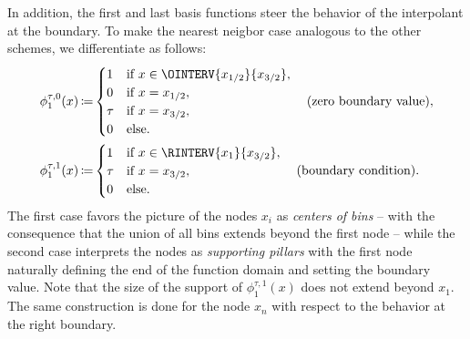 \documentclass[a4paper]{paper}
\DeclareMathOperator{\DEFEQ}{{\coloneqq}}
\begin{document}
In addition, the first and last basis functions steer the behavior of the interpolant at the boundary. To make the 
nearest neigbor case analogous to the other schemes, we differentiate as follows:
%
\begin{align*}
 \phi_1^{\tau, 0}(x) &\DEFEQ
  \begin{cases}
  1 & \text{if } x \in \OINTERV{x_{1/2}}{x_{3/2}}, \\
  0 & \text{if } x = x_{1/2}, \\
  \tau & \text{if } x = x_{3/2}, \\
  0 & \text{else}.
 \end{cases} \quad \text{(zero boundary value)}, \\
 \phi_1^{\tau, 1}(x) &\DEFEQ
  \begin{cases}
  1 & \text{if } x \in \RINTERV{x_1}{x_{3/2}}, \\
  \tau & \text{if } x = x_{3/2}, \\
  0 & \text{else}.
 \end{cases} \quad \text{(boundary condition)}. \\
\end{align*}
%
The first case favors the picture of the nodes $x_i$ as \emph{centers of bins} -- with the consequence that the union 
of all bins extends beyond the first node -- while the second case interprets the nodes as \emph{supporting pillars} 
with the first node naturally defining the end of the function domain and setting the boundary value. Note that the 
size of the support of $\phi_1^{\tau, 1}(x)$ does not extend beyond $x_1$. The same construction is done for the node 
$x_n$ with respect to the behavior at the right boundary.
\end{document}
